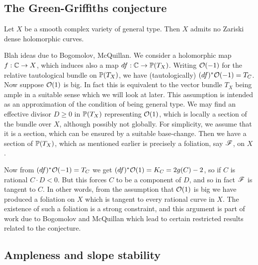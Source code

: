 
\subsection{The Green-Griffiths conjecture}


\begin{conjecture}
    Let $X$ be a smooth complex variety of general type. Then $X$ admits no
    Zariski dense holomorphic curves.
\end{conjecture}

Blah ideas due to Bogomolov, McQuillan. We consider a holomorphic map
$f:\C\to X$, which induces also a map $df:\C\to\P(T_X)$. Writing $\O(-1)$ for
the relative tautological bundle on $\P(T_X)$, we have (tautologically)
$(df)^*\O(-1)=T_C$. Now suppose $\O(1)$ is big. In fact this is equivalent to
the vector bundle $T_X$ being ample in a suitable sense which we will look at
later. %
This assumption is intended as an approximation of the condition of being
general type. We may find an effective divisor $D\ge0$ in $\P(T_X)$ representing
$\O(1)$, which is locally a section of the bundle over $X$, although possibly
not globally. For simplicity, we assume that it is a section, which can be
ensured by a suitable base-change. Then we have a section of $\P(T_X)$, which as
mentioned earlier is precisely a foliation, say $\scrF$, on $X$.

Now from $(df)^*\O(-1)=T_C$ we get $(df)^*\O(1)=K_C=2g(C)-2$, so if $C$ is
rational $C\cdot D<0$. But this forces $C$ to be a component of $D$, and so in
fact $\scrF$ is tangent to $C$. %
In other words, from the assumption that $\O(1)$ is big we have produced a
foliation on $X$ which is tangent to every rational curve in $X$. The existence
of such a foliation is a strong constraint, and this argument is part of work
due to Bogomolov and McQuillan \cite{mcquillan_98} which lead to certain
restricted results related to the conjecture.


\subsection{Ampleness and slope stability}

